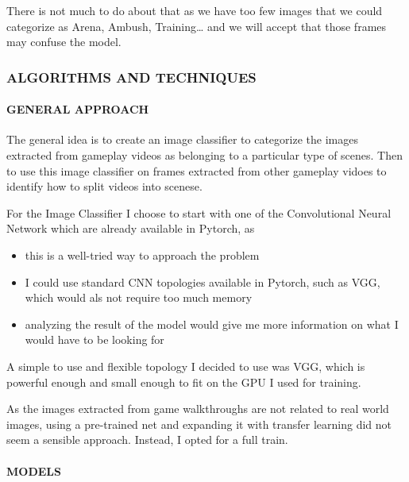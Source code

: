 \documentclass[
]{article}
\providecommand{\tightlist}{%
  \setlength{\itemsep}{0pt}\setlength{\parskip}{0pt}}
\begin{document}
There is not much to do about that as we have too few images that we
could categorize as Arena, Ambush, Training\ldots{} and we will accept
that those frames may confuse the model.

\hypertarget{algorithms-and-techniques}{%
\subsubsection{ALGORITHMS AND
TECHNIQUES}\label{algorithms-and-techniques}}

\hypertarget{general-approach}{%
\paragraph{GENERAL APPROACH}\label{general-approach}}

The general idea is to create an image classifier to categorize the
images extracted from gameplay videos as belonging to a particular type
of scenes. Then to use this image classifier on frames extracted from
other gameplay vidoes to identify how to split videos into scenese.

For the Image Classifier I choose to start with one of the Convolutional
Neural Network which are already available in Pytorch, as

\begin{itemize}
\tightlist
\item
  this is a well-tried way to approach the problem
\item
  I could use standard CNN topologies available in Pytorch, such as VGG,
  which would als not require too much memory
\item
  analyzing the result of the model would give me more information on
  what I would have to be looking for
\end{itemize}

A simple to use and flexible topology I decided to use was VGG, which is
powerful enough and small enough to fit on the GPU I used for training.

As the images extracted from game walkthroughs are not related to real
world images, using a pre-trained net and expanding it with transfer
learning did not seem a sensible approach. Instead, I opted for a full
train.

\hypertarget{models}{%
\paragraph{MODELS}\label{models}}
\end{document}
